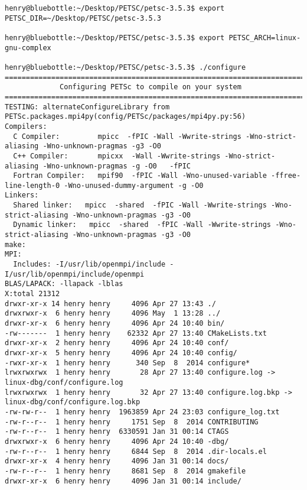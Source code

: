 \documentclass{article}
\begin{document}
\begin{scriptsize}\begin{verbatim}
henry@bluebottle:~/Desktop/PETSC/petsc-3.5.3$ export PETSC_DIR=~/Desktop/PETSC/petsc-3.5.3

henry@bluebottle:~/Desktop/PETSC/petsc-3.5.3$ export PETSC_ARCH=linux-gnu-complex

henry@bluebottle:~/Desktop/PETSC/petsc-3.5.3$ ./configure
===============================================================================
             Configuring PETSc to compile on your system                       
===============================================================================
TESTING: alternateConfigureLibrary from PETSc.packages.mpi4py(config/PETSc/packages/mpi4py.py:56)                                                                          
Compilers:
  C Compiler:         mpicc  -fPIC -Wall -Wwrite-strings -Wno-strict-aliasing -Wno-unknown-pragmas -g3 -O0 
  C++ Compiler:       mpicxx  -Wall -Wwrite-strings -Wno-strict-aliasing -Wno-unknown-pragmas -g -O0   -fPIC  
  Fortran Compiler:   mpif90  -fPIC -Wall -Wno-unused-variable -ffree-line-length-0 -Wno-unused-dummy-argument -g -O0  
Linkers:
  Shared linker:   mpicc  -shared  -fPIC -Wall -Wwrite-strings -Wno-strict-aliasing -Wno-unknown-pragmas -g3 -O0
  Dynamic linker:   mpicc  -shared  -fPIC -Wall -Wwrite-strings -Wno-strict-aliasing -Wno-unknown-pragmas -g3 -O0
make:
MPI:
  Includes: -I/usr/lib/openmpi/include -I/usr/lib/openmpi/include/openmpi
BLAS/LAPACK: -llapack -lblas
X:total 21312
drwxr-xr-x 14 henry henry     4096 Apr 27 13:43 ./
drwxrwxr-x  6 henry henry     4096 May  1 13:28 ../
drwxr-xr-x  6 henry henry     4096 Apr 24 10:40 bin/
-rw-------  1 henry henry    62332 Apr 27 13:40 CMakeLists.txt
drwxr-xr-x  2 henry henry     4096 Apr 24 10:40 conf/
drwxr-xr-x  5 henry henry     4096 Apr 24 10:40 config/
-rwxr-xr-x  1 henry henry      340 Sep  8  2014 configure*
lrwxrwxrwx  1 henry henry       28 Apr 27 13:40 configure.log -> linux-dbg/conf/configure.log
lrwxrwxrwx  1 henry henry       32 Apr 27 13:40 configure.log.bkp -> linux-dbg/conf/configure.log.bkp
-rw-rw-r--  1 henry henry  1963859 Apr 24 23:03 configure_log.txt
-rw-r--r--  1 henry henry     1751 Sep  8  2014 CONTRIBUTING
-rw-r--r--  1 henry henry  6330591 Jan 31 00:14 CTAGS
drwxrwxr-x  6 henry henry     4096 Apr 24 10:40 -dbg/
-rw-r--r--  1 henry henry     6844 Sep  8  2014 .dir-locals.el
drwxr-xr-x  4 henry henry     4096 Jan 31 00:14 docs/
-rw-r--r--  1 henry henry     8681 Sep  8  2014 gmakefile
drwxr-xr-x  6 henry henry     4096 Jan 31 00:14 include/

\end{verbatim}
\end{scriptsize}
\end{document}
